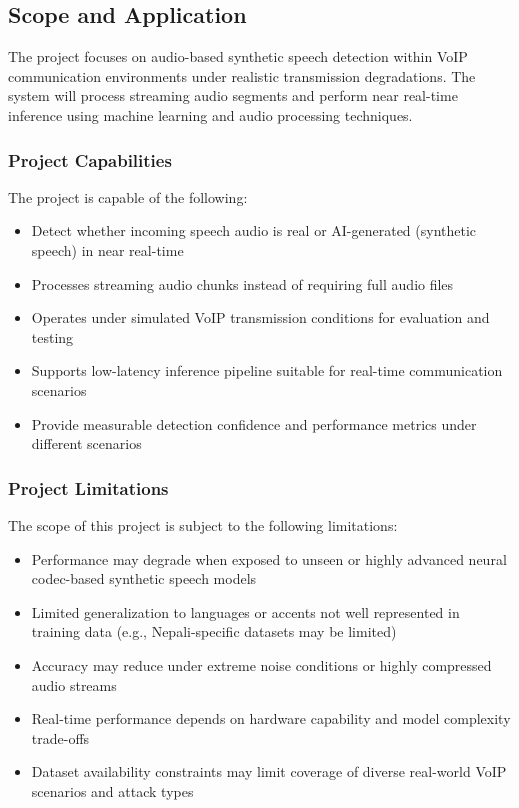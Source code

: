 \subsection{Scope and Application}

The project focuses on audio-based synthetic speech detection within VoIP communication environments under realistic transmission degradations. The system will process streaming audio segments and perform near real-time inference using machine learning and audio processing techniques. 

\subsubsection{Project Capabilities}

The project is capable of the following:
\begin{itemize}
    \item Detect whether incoming speech audio is real or AI-generated (synthetic speech) in near real-time
    \item Processes streaming audio chunks instead of requiring full audio files
    \item Operates under simulated VoIP transmission conditions for evaluation and testing
    \item Supports low-latency inference pipeline suitable for real-time communication scenarios
    \item Provide measurable detection confidence and performance metrics under different scenarios
\end{itemize}


\subsubsection{Project Limitations}

The scope of this project is subject to the following limitations:
\begin{itemize}
    \item Performance may degrade when exposed to unseen or highly advanced neural codec-based synthetic speech models
    \item Limited generalization to languages or accents not well represented in training data (e.g., Nepali-specific datasets may be limited)
    \item Accuracy may reduce under extreme noise conditions or highly compressed audio streams
    \item Real-time performance depends on hardware capability and model complexity trade-offs
    \item Dataset availability constraints may limit coverage of diverse real-world VoIP scenarios and attack types
\end{itemize}


